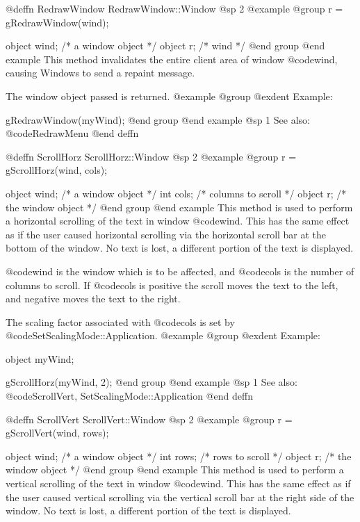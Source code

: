 @deffn {RedrawWindow} RedrawWindow::Window
@sp 2
@example
@group
r = gRedrawWindow(wind);

object  wind;   /*  a window object  */
object  r;      /*  wind             */
@end group
@end example
This method invalidates the entire client area of window @code{wind},
causing Windows to send a repaint message.

The window object passed is returned.
@example
@group
@exdent Example:

gRedrawWindow(myWind);
@end group
@end example
@sp 1
See also:  @code{RedrawMenu}
@end deffn




@deffn {ScrollHorz} ScrollHorz::Window
@sp 2
@example
@group
r = gScrollHorz(wind, cols);

object  wind;   /*  a window object     */
int     cols;   /*  columns to scroll   */
object  r;      /*  the window object   */
@end group
@end example
This method is used to perform a horizontal scrolling of the text in
window @code{wind}.  This has the same effect as if the user caused
horizontal scrolling via the horizontal scroll bar at the bottom
of the window.  No text is lost, a different portion of the text is
displayed.

@code{wind} is the window which is to be affected, and @code{cols} is the
number of columns to scroll.  If @code{cols} is positive the scroll moves
the text to the left, and negative moves the text to the right.

The scaling factor associated with @code{cols} is set by
@code{SetScalingMode::Application}.
@example
@group
@exdent Example:

object  myWind;

gScrollHorz(myWind, 2);
@end group
@end example
@sp 1
See also:  @code{ScrollVert, SetScalingMode::Application}
@end deffn











@deffn {ScrollVert} ScrollVert::Window
@sp 2
@example
@group
r = gScrollVert(wind, rows);

object  wind;   /*  a window object     */
int     rows;   /*  rows to scroll      */
object  r;      /*  the window object   */
@end group
@end example
This method is used to perform a vertical scrolling of the text in
window @code{wind}.  This has the same effect as if the user caused
vertical scrolling via the vertical scroll bar at the right side
of the window.  No text is lost, a different portion of the text is
displayed.

